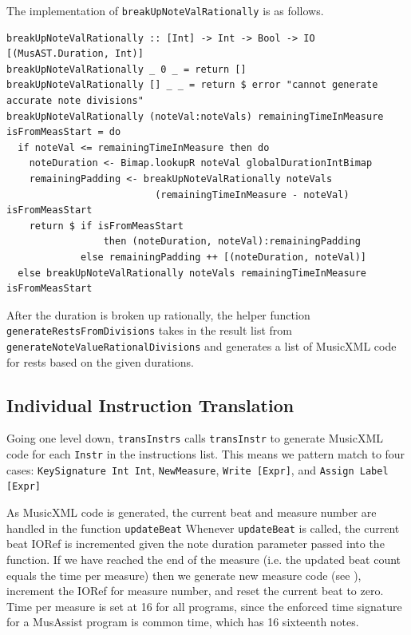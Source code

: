 \documentclass{report}
\begin{document}
The implementation of \verb.breakUpNoteValRationally. is as follows.

\begin{verbatim}
breakUpNoteValRationally :: [Int] -> Int -> Bool -> IO [(MusAST.Duration, Int)]
breakUpNoteValRationally _ 0 _ = return []
breakUpNoteValRationally [] _ _ = return $ error "cannot generate accurate note divisions" 
breakUpNoteValRationally (noteVal:noteVals) remainingTimeInMeasure isFromMeasStart = do
  if noteVal <= remainingTimeInMeasure then do
    noteDuration <- Bimap.lookupR noteVal globalDurationIntBimap 
    remainingPadding <- breakUpNoteValRationally noteVals 
                          (remainingTimeInMeasure - noteVal) isFromMeasStart
    return $ if isFromMeasStart 
                 then (noteDuration, noteVal):remainingPadding 
             else remainingPadding ++ [(noteDuration, noteVal)]
  else breakUpNoteValRationally noteVals remainingTimeInMeasure isFromMeasStart
\end{verbatim}

After the duration is broken up rationally, the helper function \verb.generateRestsFromDivisions. takes in the result list from  \verb.generateNoteValueRationalDivisions. and generates a list of MusicXML code for rests based on the given durations.

\subsection{Individual Instruction Translation}
Going one level down, \verb.transInstrs. calls \verb.transInstr. to generate MusicXML code for each \verb.Instr. in the instructions list. This means we pattern match to four cases: \verb.KeySignature Int Int., \verb.NewMeasure., \verb.Write [Expr]., and \verb.Assign Label [Expr]. 

As MusicXML code is generated, the current beat and measure number are handled in the function \verb.updateBeat. Whenever \verb.updateBeat. is called, the current beat IORef is incremented given the note duration parameter passed into the function. If we have reached the end of the measure (i.e. the updated beat count equals the time per measure) then we generate new measure code (see ), increment the IORef for measure number, and reset the current beat to zero. Time per measure is set at 16 for all programs, since the enforced time signature for a MusAssist program is common time, which has 16 sixteenth notes. 
\end{document}
